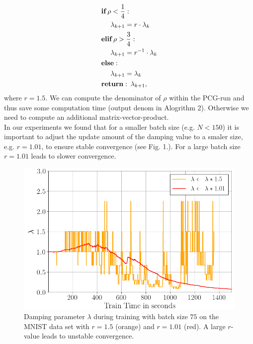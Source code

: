 \documentclass[conference]{IEEEtran}
\begin{document}
	\begin{align}
	&\textbf{if}\:\rho<\frac{1}{4}:\notag\\
	&\text{ }\text{ }\text{ }\text{ }\lambda_{k+1} = r\cdot\lambda_{k}\notag\\
	&\textbf{elif}\:\rho>\frac{3}{4}:\notag\\
	&\text{ }\text{ }\text{ }\text{ }\lambda_{k + 1} = r^{-1}\cdot\lambda_{k}\notag\\
	&\textbf{else}: \notag\\
	&\text{ }\text{ }\text{ }\text{ }\lambda_{k + 1} = \lambda_{k}\notag\\
	&\textbf{return}:\:\lambda_{k + 1},
	\end{align}
	where $r=1.5$. We can compute the denominator of $\rho$ within the PCG-run and thus save some computation time (output denom in Alogrithm 2). Otherwise we need to compute an additional matrix-vector-product.\\
	In our experiments we found that for a smaller batch size (e.g. $N<150$) it is important to adjust the update amount of the damping value to a smaler size, e.g. $r=1.01$, to ensure stable convergence (see Fig. 1.). For a large batch size $r=1.01$ leads to slower convergence.
	
	\begin{figure}[htbp]
		\centerline{\includegraphics[scale=0.52]{lambda.png}}
		\caption{Damping parameter $\lambda$ during training with batch size $75$ on the MNIST data set with $r=1.5$ (orange) and $r=1.01$ (red). A large $r$-value leads to unstable convergence.}
		\label{fig1}
	\end{figure}
	
	
\end{document}
